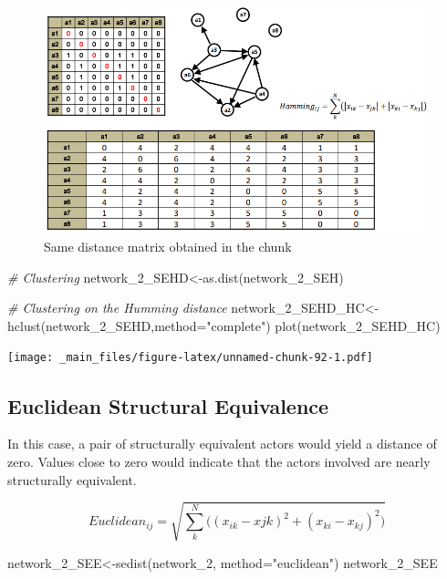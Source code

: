\documentclass[
  notitlepage,
  onecolumn,
  openany]{book}
\newenvironment{Shaded}{\begin{snugshade}}{\end{snugshade}}
\newcommand{\AttributeTok}[1]{\textcolor[rgb]{0.77,0.63,0.00}{#1}}
\newcommand{\CommentTok}[1]{\textcolor[rgb]{0.56,0.35,0.01}{\textit{#1}}}
\newcommand{\FunctionTok}[1]{\textcolor[rgb]{0.00,0.00,0.00}{#1}}
\newcommand{\NormalTok}[1]{#1}
\newcommand{\OtherTok}[1]{\textcolor[rgb]{0.56,0.35,0.01}{#1}}
\newcommand{\StringTok}[1]{\textcolor[rgb]{0.31,0.60,0.02}{#1}}
\begin{document}
\begin{figure}[h!]

{\centering \includegraphics[width=0.5\linewidth]{images/11-Subgroups and Structural Equivalence/Untitled 7} 

}

\caption{Same distance matrix obtained in the chunk}\label{fig:unnamed-chunk-91}
\end{figure}

\begin{Shaded}
\begin{Highlighting}[]
\CommentTok{\# Clustering}
\NormalTok{network\_2\_SEHD}\OtherTok{\textless{}{-}}\FunctionTok{as.dist}\NormalTok{(network\_2\_SEH)}

\CommentTok{\# Clustering on the Humming distance}
\NormalTok{network\_2\_SEHD\_HC}\OtherTok{\textless{}{-}}\FunctionTok{hclust}\NormalTok{(network\_2\_SEHD,}\AttributeTok{method=}\StringTok{"complete"}\NormalTok{)}
\FunctionTok{plot}\NormalTok{(network\_2\_SEHD\_HC)}
\end{Highlighting}
\end{Shaded}

\texttt{[image: \_main\_files/figure-latex/unnamed-chunk-92-1.pdf]}

\hypertarget{euclidean-structural-equivalence}{%
\subsection{Euclidean Structural Equivalence}\label{euclidean-structural-equivalence}}

In this case, a pair of structurally equivalent actors would yield a distance of zero. Values close to zero would indicate that the actors involved are nearly structurally equivalent.

\[
Euclidean_{ij} = \sqrt{\sum_k^N \Big((x_{ik}-x{jk})^2+(x_{ki}-x_{kj})^2\Big)}
\]

\begin{Shaded}
\begin{Highlighting}[]
\NormalTok{network\_2\_SEE}\OtherTok{\textless{}{-}}\FunctionTok{sedist}\NormalTok{(network\_2, }\AttributeTok{method=}\StringTok{"euclidean"}\NormalTok{)}
\NormalTok{network\_2\_SEE}
\end{Highlighting}
\end{Shaded}
\end{document}
